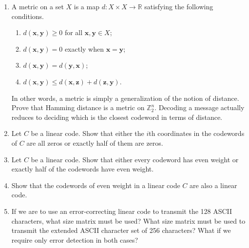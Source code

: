 {\begin{enumerate}
\begin{enumerate}
 \item
$d({\mathbf x}, {\mathbf y}) = w({\mathbf x}- {\mathbf y})$
 
\end{enumerate}
 
 
\item
A {\bfi metric\/} on a set $X$ is a map $d: X \times X
\rightarrow {\mathbb R}$ satisfying the following conditions. 
\begin{enumerate}
 
 \item
$d( {\mathbf x}, {\mathbf y}) \geq 0$ for all ${\mathbf x}, {\mathbf y} \in
X$; 
 
 \item
$d( {\mathbf x}, {\mathbf y}) = 0$ exactly when ${\mathbf x} = {\mathbf y}$; 
 
 \item
$d( {\mathbf x}, {\mathbf y})= d( {\mathbf y}, {\mathbf x})$;
 
 \item
$d( {\mathbf x}, {\mathbf y}) \leq d( {\mathbf x}, {\mathbf z}) + d( {\mathbf
z}, {\mathbf y})$. 
 
\end{enumerate}
In other words, a metric is simply a generalization of the notion of
distance. Prove that Hamming distance is a metric on ${\mathbb Z}_2^n$.
Decoding a message actually reduces to deciding which is the closest
codeword in terms of distance.
 
 
\item
Let $C$ be a linear code. Show that either the $i$th coordinates in the
codewords of $C$ are all zeros or exactly half of them are zeros. 
 
 
\item
Let $C$ be a linear code. Show that either every codeword has even
weight or exactly half of the codewords have even weight.
 
 
\item
Show that the codewords of even weight in a linear code $C$ are also a
linear code. 
 
 
 
 
\item
If we are to use an error-correcting linear code to transmit the 128
ASCII characters, what size matrix must be used? What size matrix must
be used to transmit the extended ASCII character set of 256
characters?  What if we require only error detection in both cases?
 

\end{enumerate}}

